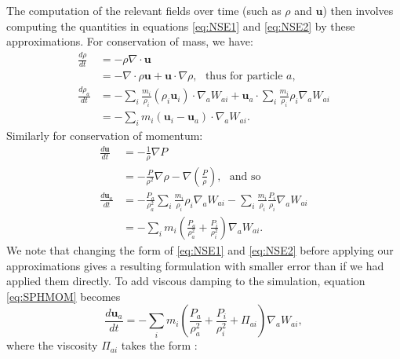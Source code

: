 \documentclass[11pt]{article}
\begin{document}
The computation of the relevant fields over time (such as $\rho$ and $\bm{u}$) then involves computing the quantities in equations \ref{eq:NSE1} and \ref{eq:NSE2} by these approximations. For conservation of mass, we have:
\begin{align}
\frac{d\rho}{d t}  &= - \rho\nabla \cdot   \bm{u}\nonumber\\
			& = -\nabla \cdot \rho \bm{u} + \bm{u} \cdot \nabla \rho, \ \ \ \text{thus for particle $a$,}\nonumber \\
\frac{d\rho_a}{d t}	& = -  \sum_{i} \frac{m_i}{\rho_i} (\rho_i \bm{u}_i) \cdot \nabla_a W_{ai} + \bm{u}_a \cdot  \sum_{i} \frac{m_i}{\rho_i} \rho_i \nabla_a W_{ai}\nonumber\\
			& = -  \sum_{i} m_i (\bm{u}_i - \bm{u}_a) \cdot  \nabla_a W_{ai}.\label{eq:SPHCONT}
\end{align}
Similarly for conservation of momentum:
\begin{align}
\frac{d\bm{u}}{d t} &=-\frac{1}{\rho}\nabla P\nonumber\\
			& = - \frac{P}{\rho^2} \nabla\rho - \nabla\left(\frac{P}{\rho} \right), \ \ \ \text{and so}\nonumber\\
\frac{d\bm{u}_a}{d t} 	& = -  \frac{P_a}{\rho_a^2} \sum_{i} \frac{m_i}{\rho_i} \rho_i  \nabla_a W_{ai} - \sum_{i} \frac{m_i}{\rho_i} \frac{P_i}{\rho_i} \nabla_a W_{ai} \nonumber\\
			& =  - \sum_{i} m_i \left( \frac{P_a}{\rho_a^2}+ \frac{P_i}{\rho_i^2} \right)\nabla_a W_{ai}.\label{eq:SPHMOM}
\end{align}
We note that changing the form of \ref{eq:NSE1} and \ref{eq:NSE2} before applying our approximations gives a resulting formulation with smaller error than if we had applied them directly. To add viscous damping to the simulation, equation \ref{eq:SPHMOM} becomes 
\begin{equation}
\frac{d\bm{u}_a}{d t} =  - \sum_{i} m_i \left( \frac{P_a}{\rho_a^2}+ \frac{P_i}{\rho_i^2} + \Pi_{ai} \right)\nabla_a W_{ai},
\end{equation}
where the viscosity $\Pi_{ai}$ takes the form \cite{Mon94}:
\end{document}
